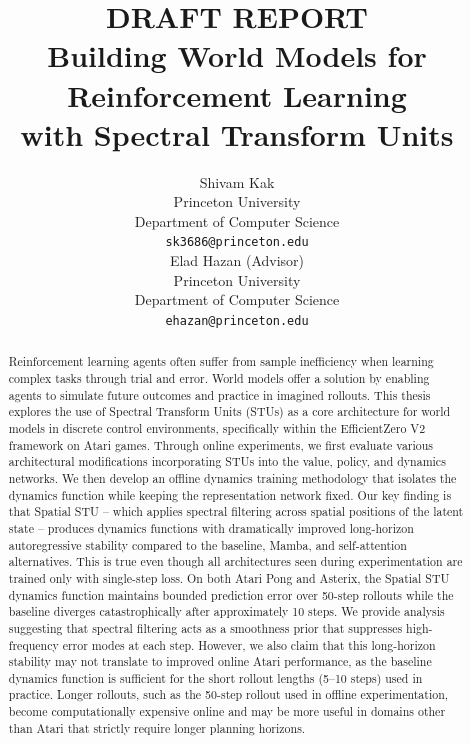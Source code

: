 \documentclass[10pt,twocolumn]{IEEEtran}
\begin{document}
\title{\large\textbf{DRAFT REPORT}\\[0.5em]\Large\textbf{Building World Models for Reinforcement Learning\\with Spectral Transform Units}}

\author{
\begin{tabular}[t]{c}
Shivam Kak\\
Princeton University\\
Department of Computer Science\\
\texttt{sk3686@princeton.edu}
\end{tabular}
\hspace{1.5cm}
\begin{tabular}[t]{c}
Elad Hazan (Advisor)\\
Princeton University\\
Department of Computer Science\\
\texttt{ehazan@princeton.edu}
\end{tabular}
}

\maketitle

\begin{abstract}
Reinforcement learning agents often suffer from sample inefficiency when learning complex tasks through trial and error. World models offer a solution by enabling agents to simulate future outcomes and practice in imagined rollouts. This thesis explores the use of Spectral Transform Units (STUs) as a core architecture for world models in discrete control environments, specifically within the EfficientZero V2 framework on Atari games. Through online experiments, we first evaluate various architectural modifications incorporating STUs into the value, policy, and dynamics networks. We then develop an offline dynamics training methodology that isolates the dynamics function while keeping the representation network fixed. Our key finding is that Spatial STU -- which applies spectral filtering across spatial positions of the latent state -- produces dynamics functions with dramatically improved long-horizon autoregressive stability compared to the baseline, Mamba, and self-attention alternatives. This is true even though all architectures seen during experimentation are trained only with single-step loss. On both Atari Pong and Asterix, the Spatial STU dynamics function maintains bounded prediction error over 50-step rollouts while the baseline diverges catastrophically after approximately 10 steps. We provide analysis suggesting that spectral filtering acts as a smoothness prior that suppresses high-frequency error modes at each step. However, we also claim that this long-horizon stability may not translate to improved online Atari performance, as the baseline dynamics function is sufficient for the short rollout lengths (5--10 steps) used in practice. Longer rollouts, such as the 50-step rollout used in offline experimentation, become computationally expensive online and may be more useful in domains other than Atari that strictly require longer planning horizons.
\end{abstract}
\end{document}
